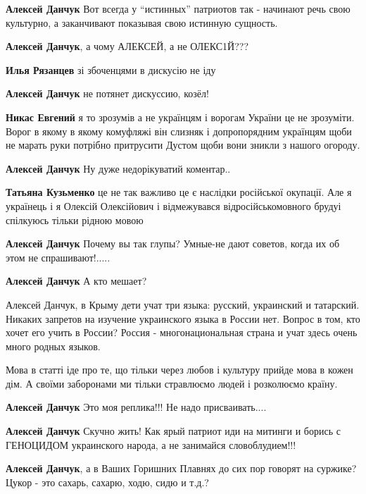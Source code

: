 \begin{itemize}
\begin{itemize}
\textbf{Алексей Данчук} Вот всегда у \enquote{истинных} патриотов так - начинают речь
свою культурно, а заканчивают показывая свою истинную сущность.

\textbf{Алексей Данчук}, а чому АЛЕКСЕЙ, а не ОЛЕКС1Й???

\textbf{Илья Рязанцев} зі збоченцями в дискусію не іду

\textbf{Алексей Данчук} не потянет дискуссию, козёл!


\textbf{Никас Евгений} я то зрозумів а не українцям і ворогам України це не зрозуміти.
Ворог в якому в якому комуфляжі він слизняк і допропорядним українцям щоби не
марать руки потрібно притрусити Дустом щоби вони зникли з нашого огороду.

\textbf{Алексей Данчук} Ну дуже недорікуватий коментар..

\textbf{Татьяна Кузьменко} це не так важливо це є наслідки російської окупації.
Але я українець і я Олексій Олексійович і відмежувався відросійськомовного
брудуі спілкуюсь тільки рідною мовою

\textbf{Алексей Данчук} Почему вы так глупы? Умные-не дают советов, когда их об этом не спрашивают!.....

\textbf{Алексей Данчук} А кто мешает?


Алексей Данчук, в Крыму дети учат три языка: русский, украинский и татарский.
Никаких запретов на изучение украинского языка в России нет. Вопрос в том, кто
хочет его учить в России? Россия - многонациональная страна и учат здесь очень
много родных языков.

Мова в статті іде про те, що тільки через любов і культуру прийде мова в кожен
дім. А своїми заборонами ми тільки стравлюємо людей і розколюємо країну.

\textbf{Алексей Данчук} Это моя реплика!!! Не надо присваивать....

\textbf{Алексей Данчук} Скучно жить! Как ярый патриот иди на митинги и борись с
ГЕНОЦИДОМ украинского народа, а не занимайся словоблудием!!!

\textbf{Алексей Данчук}, а в Ваших Горишних Плавнях до сих пор говорят на
суржике? Цукор - это сахарь, сахарю, ходю, сидю и т.д.?



\end{itemize}
\end{itemize}
